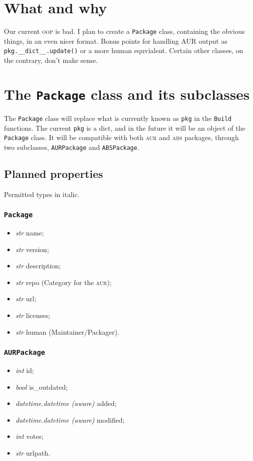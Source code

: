 \documentclass[a4paper,english]{book}
\numberwithin{equation}{section}
\newcommand{\p}[1]{\nohyphens{\texttt{#1}}}
\begin{document}
\chapter{What and why}

Our current \textsc{oop} is bad.  I plan to create a \p{Package} class, containing the obvious things, in an even nicer format.  Bonus points for handling AUR output as \p{pkg.\_\_dict\_\_.update()} or a more human equvialent.  Certain other classes, on the contrary, don’t make sense.

\chapter{The \p{Package} class and its subclasses} \label{chap:2:package}

The \p{Package} class will replace what is currently known as \p{pkg} in the \p{Build} functions.  The current \p{pkg} is a dict, and in the future it will be an object of the \p{Package} class.  It will be compatible with both \textsc{aur} and \textsc{abs} packages, through two subclasses, \p{AURPackage} and \p{ABSPackage}.

\section{Planned properties}

Permitted types in italic.

\subsection{\p{Package}}
\begin{itemize}
\item \emph{str} name;
\item \emph{str} version;
\item \emph{str} description;
\item \emph{str} repo (Category for the \textsc{aur});
\item \emph{str} url;
\item \emph{str} licenses;
\item \emph{str} human (Maintainer/Packager).
\end{itemize}

\subsection{\p{AURPackage}}

\begin{itemize}
\item \emph{int} id;
\item \emph{bool} is\_outdated;
\item \emph{datetime.datetime (aware)} added;
\item \emph{datetime.datetime (aware)} modified;
\item \emph{int} votes;
\item \emph{str} urlpath.
\end{itemize}
\end{document}
